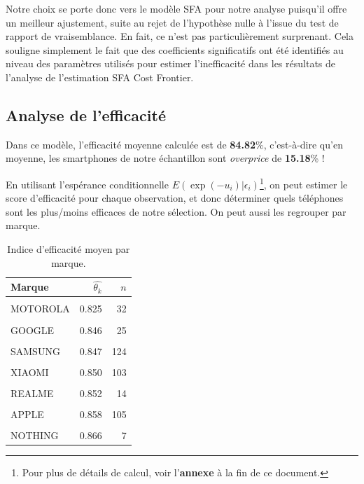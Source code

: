 \documentclass[
  12pt,
]{report}
\begin{document}
Notre choix se porte donc vers le modèle SFA pour notre analyse
puisqu'il offre un meilleur ajustement, suite au rejet de l'hypothèse
nulle à l'issue du test de rapport de vraisemblance. En fait, ce n'est
pas particulièrement surprenant. Cela souligne simplement le fait que
des coefficients significatifs ont été identifiés au niveau des
paramètres utilisés pour estimer l'inefficacité dans les résultats de
l'analyse de l'estimation SFA Cost Frontier.

\subsection{Analyse de l'efficacité}\label{analyse-de-lefficacituxe9}

Dans ce modèle, l'efficacité moyenne calculée est de \textbf{84.82}\%,
c'est-à-dire qu'en moyenne, les smartphones de notre échantillon sont
\emph{overprice} de \textbf{15.18}\% !

En utilisant l'espérance conditionnelle
\(E(\exp(-u_i) | \epsilon_i)\)\footnote{Pour plus de détails de calcul,
  voir l'\textbf{annexe} à la fin de ce document.}, on peut estimer le
score d'efficacité pour chaque observation, et donc déterminer quels
téléphones sont les plus/moins efficaces de notre sélection. On peut
aussi les regrouper par marque.

\begin{table}[!h]
\centering
\caption{\label{tab:eff_brands}Indice d'efficacité moyen par marque.}
\centering
\begin{tabular}[t]{lrr}
\toprule
\textbf{Marque} & \textbf{$\hat{\theta_k}$} & \textbf{$n$}\\
\midrule
\cellcolor{gray!10}{OPPO} & \cellcolor{gray!10}{0.817} & \cellcolor{gray!10}{17}\\
MOTOROLA & 0.825 & 32\\
\cellcolor{gray!10}{HONOR} & \cellcolor{gray!10}{0.842} & \cellcolor{gray!10}{14}\\
GOOGLE & 0.846 & 25\\
\cellcolor{gray!10}{ASUS} & \cellcolor{gray!10}{0.847} & \cellcolor{gray!10}{12}\\
\addlinespace
SAMSUNG & 0.847 & 124\\
\cellcolor{gray!10}{VIVO} & \cellcolor{gray!10}{0.850} & \cellcolor{gray!10}{9}\\
XIAOMI & 0.850 & 103\\
\cellcolor{gray!10}{ONEPLUS} & \cellcolor{gray!10}{0.852} & \cellcolor{gray!10}{7}\\
REALME & 0.852 & 14\\
\addlinespace
\cellcolor{gray!10}{SONY} & \cellcolor{gray!10}{0.855} & \cellcolor{gray!10}{15}\\
APPLE & 0.858 & 105\\
\cellcolor{gray!10}{FAIRPHONE} & \cellcolor{gray!10}{0.864} & \cellcolor{gray!10}{3}\\
NOTHING & 0.866 & 7\\
\bottomrule
\end{tabular}
\end{table}
\end{document}
